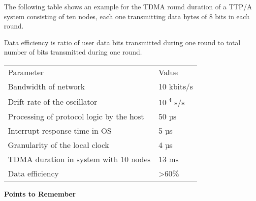 The following table shows an example for the TDMA round duration of a
TTP/A system consisting of ten nodes, each one transmitting data bytes
of 8 bits in each round.

Data efficiency is ratio of user data bits transmitted during one round
to total number of bits transmitted during one round.

\begin{longtable}[c]{@{}ll@{}}
\toprule
Parameter & Value\tabularnewline
Bandwidth of network & 10 kbits/s\tabularnewline
Drift rate of the oscillator & 10\textsuperscript{-4} s/s\tabularnewline
Processing of protocol logic by the host & 50 µs\tabularnewline
Interrupt response time in OS & 5 µs\tabularnewline
Granularity of the local clock & 4 µs\tabularnewline
TDMA duration in system with 10 nodes & 13 ms\tabularnewline
Data efficiency & \textgreater{}60\%\tabularnewline
\bottomrule
\end{longtable}

\protect\hypertarget{teil9}{}{}\textbf{Points to Remember}
